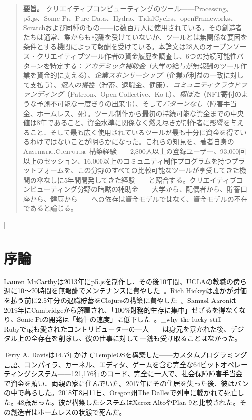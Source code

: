 \documentclass[10pt,letterpaper,twocolumn]{article}
\newcommand{\ac}{\textsc{Aesthetic.Computer}}
\begin{document}
{\begin{quote}
\small\noindent\textbf{要旨。}
クリエイティブコンピューティングのツール——Processing、p5.js、Sonic Pi、Pure Data、Hydra、TidalCycles、openFrameworks、Scratchおよび同種のもの——は数百万人に使用されている。その創造者たちは通常、誰からも報酬を受けていないか、ツールとは無関係な要因を条件とする機関によって報酬を受けている。本論文は28人のオープンソース・クリエイティブツール作者の資金履歴を調査し、6つの持続可能性パターンを特定する：\emph{アカデミック補助金}（大学の給与が無報酬のツール作業を資金的に支える）、\emph{企業スポンサーシップ}（企業が利益の一致に対して支払う）、\emph{個人の犠牲}（貯蓄、退職金、健康）、\emph{コミュニティクラウドファンディング}（Patreon、Open Collective、Ko-fi）、\emph{棚ぼた}（NFT寄付のような予測不可能な一度きりの出来事）、そして\emph{パターンなし}（障害手当金、ホームレス、死）。ツール制作から最初の持続可能な資金までの中央値は8年であること、資金水準に関係なく燃え尽きが制作者に影響を与えること、そして最も広く使用されているツールが最も十分に資金を得ているわけではないことが明らかになった。これらの知見を、著者自身の\ac{}~\citep{scudder2026ac}構築経験——2,800人以上の登録ユーザー、93,000回以上のセッション、16,000以上のコミュニティ制作プログラムを持つプラットフォームを、この分野のすべての比較可能なツールが享受してきた機関の傘なしに5年間開発してきた経験——と照合する。クリエイティブコンピューティング分野の暗黙の補助金——大学から、配偶者から、貯蓄口座から、健康から——への依存は資金モデルではなく、資金モデルの不在であると論じる。
\end{quote}
\vspace{0.5em}
}]

\section{序論}

Lauren McCarthyは2013年にp5.jsを制作し、その後10年間、UCLAの教職の傍ら週に10〜20時間を無報酬でメンテナンスに費やした~\citep{mccarthy2023making}。Rich Hickeyは誰かが対価を払う前に2.5年分の退職貯蓄をClojureの構築に費やした~\citep{hickey2020history}。Samuel Aaronは2019年にCambridgeから解雇され、「100\%財務的生存に集中」せざるを得なくなり、Sonic Piの開発は「蝸牛の速度」に低下した~\citep{aaron2016sonic}。\_why the lucky stiff——Rubyで最も愛されたコントリビューターの一人——は身元を暴かれた後、デジタル上の全存在を削除し、彼の仕事に対して一銭も受け取ることはなかった。

Terry A. Davisは14.7年かけてTempleOSを構築した——カスタムプログラミング言語、コンパイラ、カーネル、エディタ、ゲームを含む完全な64ビットオペレーティングシステム——121,176行のコード、完全に一人で、社会保障障害手当金で資金を賄い、両親の家に住んでいた。2017年にその住居を失った後、彼はバンの中で暮らした。2018年8月11日、Oregon州The Dallesで列車に轢かれて死亡した。48歳だった。彼が構築したシステムはXerox AltoやPlan 9と比較された。その創造者はホームレスの状態で死んだ。
\end{document}
